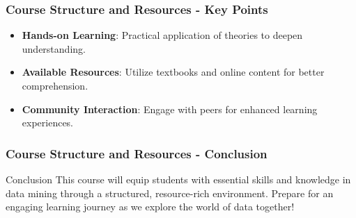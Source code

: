 \documentclass{beamer}
\begin{document}
\begin{frame}[fragile]
    \frametitle{Course Structure and Resources - Key Points}
    \begin{itemize}
        \item \textbf{Hands-on Learning}: Practical application of theories to deepen understanding.
        \item \textbf{Available Resources}: Utilize textbooks and online content for better comprehension.
        \item \textbf{Community Interaction}: Engage with peers for enhanced learning experiences.
    \end{itemize}
\end{frame}

\begin{frame}[fragile]
    \frametitle{Course Structure and Resources - Conclusion}
    \begin{block}{Conclusion}
        This course will equip students with essential skills and knowledge in data mining through a structured, resource-rich environment. Prepare for an engaging learning journey as we explore the world of data together!
    \end{block}
\end{frame}
\end{document}
